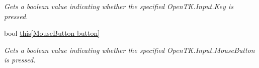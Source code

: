 \begin{DoxyCompactItemize}
\begin{DoxyCompactList}\small\item\em Gets a boolean value indicating whether the specified Open\-T\-K.\-Input.\-Key is pressed. \end{DoxyCompactList}\item 
bool \hyperlink{interface_tri_devs_1_1_tri_engine2_d_1_1_input_1_1_i_input_manager_a1ab67e0dc3518f968641893310d47db1}{this\mbox{[}\-Mouse\-Button button\mbox{]}}
\begin{DoxyCompactList}\small\item\em Gets a boolean value indicating whether the specified Open\-T\-K.\-Input.\-Mouse\-Button is pressed. \end{DoxyCompactList}\end{DoxyCompactItemize}
